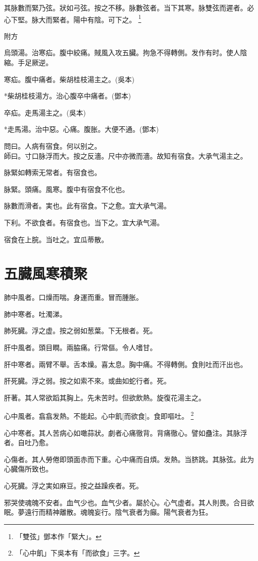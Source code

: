 \documentclass[12pt,oneside,UTF8,b5paper]{ctexbook}她她她她她她她
\begin{document}
其脉數而緊乃弦。狀如弓弦。按之不移。脉數弦者。当下其寒。脉雙弦而遲者。必心下堅。脉大而緊者。陽中有陰。可下之。
	\footnote{「雙弦」鄧本作「緊大」。}

附方

烏頭湯。治寒疝。腹中絞痛。賊風入攻五臟。拘急不得轉側。发作有时。使人陰縮。手足厥逆。

寒疝。腹中痛者。柴胡桂枝湯主之。(吳本)

*柴胡桂枝湯方。治心腹卒中痛者。(鄧本)

卒疝。走馬湯主之。(吳本)

*走馬湯。治中惡。心痛。腹胀。大便不通。(鄧本)

問曰。人病有宿食。何以别之。\\
師曰。寸口脉浮而大。按之反濇。尺中亦微而濇。故知有宿食。大承气湯主之。

脉緊如轉索无常者。有宿食也。

脉緊。頭痛。風寒。腹中有宿食不化也。

脉數而滑者。実也。此有宿食。下之愈。宜大承气湯。

下利。不欲食者。有宿食也。当下之。宜大承气湯。

宿食在上脘。当吐之。宜瓜蒂散。

\chapter{五臓風寒積聚}

肺中風者。口燥而喘。身運而重。冒而腫胀。

肺中寒者。吐濁涕。

肺死臓。浮之虚。按之弱如葱葉。下无根者。死。

肝中風者。頭目瞤。兩脇痛。行常傴。令人嗜甘。

肝中寒者。兩臂不舉。舌本燥。喜太息。胸中痛。不得轉側。食則吐而汗出也。

肝死臓。浮之弱。按之如索不來。或曲如蛇行者。死。

肝著。其人常欲蹈其胸上。先未苦时。但欲飲熱。旋復花湯主之。

心中風者。翕翕发熱。不能起。心中飢[而欲食]。食即嘔吐。
	\footnote{「心中飢」下吳本有「而欲食」三字。}

心中寒者。其人苦病心如噉蒜狀。劇者心痛徹背。背痛徹心。譬如蠱注。其脉浮者。自吐乃愈。

心傷者。其人勞倦即頭面赤而下重。心中痛而自煩。发熱。当脐跳。其脉弦。此为心臓傷所致也。

心死臓。浮之実如麻豆。按之益躁疾者。死。

邪哭使魂魄不安者。血气少也。血气少者。屬於心。心气虚者。其人則畏。合目欲眠。夢遠行而精神離散。魂魄妄行。陰气衰者为癲。陽气衰者为狂。
\end{document}
